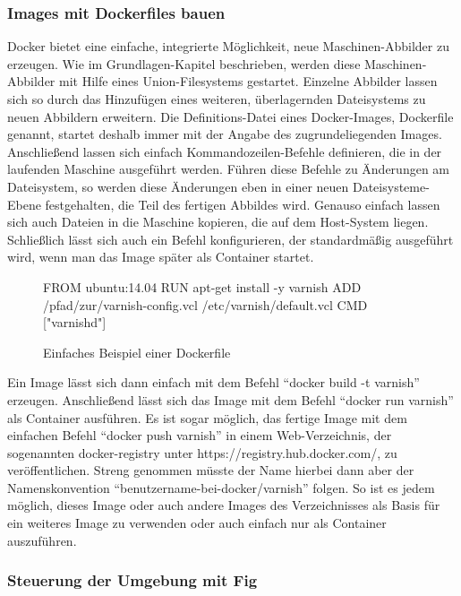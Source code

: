 \subsubsection{Images mit Dockerfiles bauen}

Docker bietet eine einfache, integrierte Möglichkeit, neue Maschinen-Abbilder zu erzeugen. Wie im Grundlagen-Kapitel beschrieben, werden diese Maschinen-Abbilder mit Hilfe eines Union-Filesystems gestartet. Einzelne Abbilder lassen sich so durch das Hinzufügen eines weiteren, überlagernden Dateisystems zu neuen Abbildern erweitern. Die Definitions-Datei eines Docker-Images, Dockerfile genannt, startet deshalb immer mit der Angabe des zugrundeliegenden Images. Anschließend lassen sich einfach Kommandozeilen-Befehle definieren, die in der laufenden Maschine ausgeführt werden. Führen diese Befehle zu Änderungen am Dateisystem, so werden diese Änderungen eben in einer neuen Dateisysteme-Ebene festgehalten, die Teil des fertigen Abbildes wird. Genauso einfach lassen sich auch Dateien in die Maschine kopieren, die auf dem Host-System liegen. Schließlich lässt sich auch ein Befehl konfigurieren, der standardmäßig ausgeführt wird, wenn man das Image später als Container startet.

\begin{figure}[!ht]
  \begin{center}
    \begin{dockercode}
FROM ubuntu:14.04
RUN apt-get install -y varnish
ADD /pfad/zur/varnish-config.vcl /etc/varnish/default.vcl
CMD ["varnishd"]
    \end{dockercode}
    \caption{Einfaches Beispiel einer Dockerfile}
  \end{center}
\end{figure}

Ein Image lässt sich dann einfach mit dem Befehl "`docker build -t varnish"' erzeugen. Anschließend lässt sich das Image mit dem Befehl "`docker run varnish"' als Container ausführen. Es ist sogar möglich, das fertige Image mit dem einfachen Befehl "`docker push varnish"' in einem Web-Verzeichnis, der sogenannten docker-registry unter https://registry.hub.docker.com/, zu veröffentlichen. Streng genommen müsste der Name hierbei dann aber der Namenskonvention "`benutzername-bei-docker/varnish"' folgen. So ist es jedem möglich, dieses Image oder auch andere Images des Verzeichnisses als Basis für ein weiteres Image zu verwenden oder auch einfach nur als Container auszuführen.

\subsubsection{Steuerung der Umgebung mit Fig}

